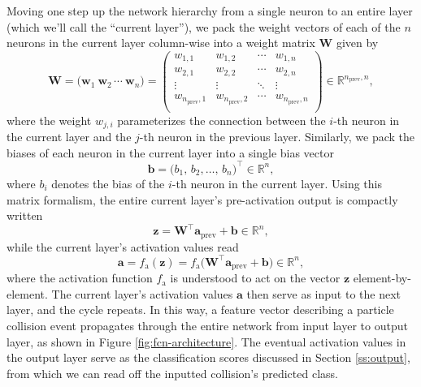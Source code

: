 \documentclass[11pt, a4paper]{article}
\renewcommand{\vec}[1]{\bm{#1}}
\newcommand{\mat}[1]{\mathbf{#1}}
\newcommand{\W}{\mat{W}}
\newcommand{\w}{\vec{w}}
\renewcommand{\b}{\vec{b}}
\newcommand{\z}{\vec{z}}
\renewcommand{\a}{\vec{a}}
\begin{document}
Moving one step up the network hierarchy from a single neuron to an entire layer (which we'll call the ``current layer''), we pack the weight vectors of each of the $ n $ neurons in the current layer column-wise into a weight matrix $ \W $ given by
\begin{equation*}
   \W = \Big( \w_{1} \ \w_{2} \, \cdots \ \w_{n} \Big) =
    \begin{pmatrix}
        w_{1, 1} & w_{1, 2} & \cdots & w_{1, n}\\
        w_{2, 1} & w_{2, 2} & \cdots & w_{2, n}\\
        \vdots & \vdots & \ddots & \vdots\\
        w_{n_{\text{prev}}, 1} & w_{n_{\text{prev}}, 2} & \cdots & w_{n_{\text{prev}}, n}\\
    \end{pmatrix} \in \mathbb{R}^{n_{\text{prev}}, n},
\end{equation*}
where the weight $ w_{j, i} $ parameterizes the connection between the $ i $-th neuron in the current layer and the $ j $-th neuron in the previous layer.
Similarly, we pack the biases of each neuron in the current layer into a single bias vector
\begin{equation*}
    \b = \big( b_{1}, \, b_{2}, \ldots, \, b_{n} \big)^{\top} \in \mathbb{R}^{n},
\end{equation*}
where $ b_{i} $ denotes the bias of the $ i $-th neuron in the current layer.
Using this matrix formalism, the entire current layer's pre-activation output is compactly written
\begin{equation*}
    \vec{z} = \W^{\top} \a_{\text{prev}} + \b \in \mathbb{R}^{n},
\end{equation*}
while the current layer's activation values read
\begin{equation*}
    \a = f_{\text{a}}(\z) = f_{\text{a}} \Big( \W^{\top} \a_{\text{prev}} + \b\Big) \in \mathbb{R}^{n},
\end{equation*}
where the activation function $ f_{\text{a}} $ is understood to act on the vector $ \z $ element-by-element.
The current layer's activation values $ \a $ then serve as input to the next layer, and the cycle repeats.
In this way, a feature vector describing a particle collision event propagates through the entire network from input layer to output layer, as shown in Figure \ref{fig:fcn-architecture}.
The eventual activation values in the output layer serve as the classification scores discussed in Section \ref{ss:output}, from which we can read off the inputted collision's predicted class.
\end{document}
